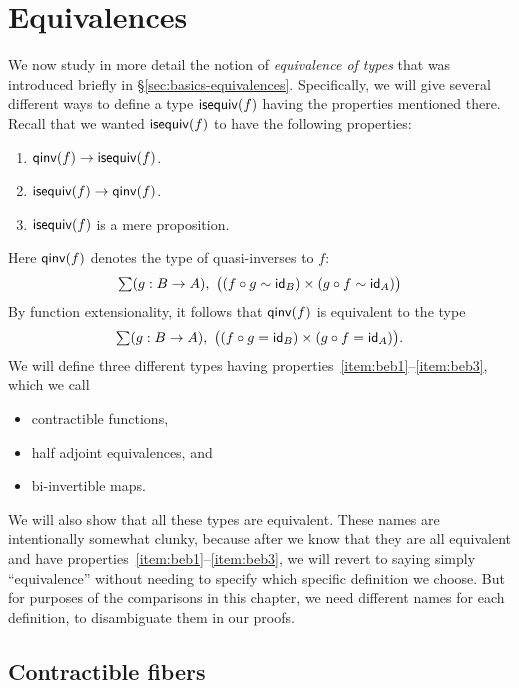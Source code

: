 \newcommand{\coh}[3]{\mathtt{coh} \; #1 \; #2 \; #3}

\chapter{Equivalences}
\label{cha:equivalences}

We now study in more detail the notion of \emph{equivalence of types} that was introduced briefly in \S\ref{sec:basics-equivalences}.
Specifically, we will give several different ways to define a type $\mathsf{isequiv}(f)$ having the properties mentioned there.
Recall that we wanted $\mathsf{isequiv}(f)$ to have the following properties:
\begin{enumerate}
\item $\mathsf{qinv}(f) \to \mathsf{isequiv} (f)$.\label{item:beb1}
\item $\mathsf{isequiv} (f) \to \mathsf{qinv}(f)$.\label{item:beb2}
\item $\mathsf{isequiv}(f)$ is a mere proposition.\label{item:beb3}
\end{enumerate}
Here $\mathsf{qinv}(f)$ denotes the type of quasi-inverses to $f$:
\begin{equation*}
  \sm{g:B\to A} \big((f \circ g \htpy \idfunc[B]) \times (g\circ f \htpy \idfunc[A])\big)
\end{equation*}
By function extensionality, it follows that $\mathsf{qinv}(f)$ is equivalent to the type
\begin{equation*}
  \sm{g:B\to A} \big((f \circ g = \idfunc[B]) \times (g\circ f = \idfunc[A])\big).
\end{equation*}
We will define three different types having properties~\ref{item:beb1}--\ref{item:beb3}, which we call
\begin{itemize}
\item contractible functions,
\item half adjoint equivalences, and
\item bi-invertible maps.
\end{itemize}
We will also show that all these types are equivalent.
These names are intentionally somewhat clunky, because after we know that they are all equivalent and have properties~\ref{item:beb1}--\ref{item:beb3}, we will revert to saying simply ``equivalence'' without needing to specify which specific definition we choose.
But for purposes of the comparisons in this chapter, we need different names for each definition, to disambiguate them in our proofs.


\section{Contractible fibers}
\label{sec:contrf}

